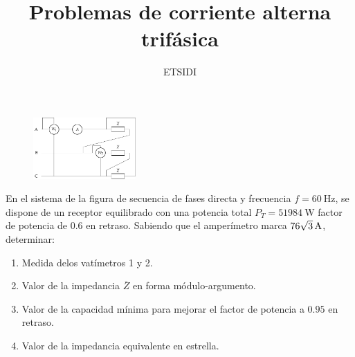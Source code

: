 \documentclass[a4paper,11pt]{article}
\title{Problemas de corriente alterna trifásica}
\date{}
\author{ETSIDI}
\begin{document}
\maketitle


\section{} 
\begin{figure}
		\centering
		\includegraphics[width=0.35\textwidth]{figuras/ej1_CAtrif.pdf}
	\end{figure}
En el sistema de la figura de secuencia de fases directa y frecuencia $f=\SI{60}{\hertz}$, se dispone de un receptor equilibrado con una potencia total $P_T=\SI{51984}{\watt}$ factor de potencia de $0.6$ en retraso. Sabiendo que el amperímetro marca $\SI[parse-numbers=false]{76\sqrt{3}}{\ampere}$, determinar:
\begin{enumerate}
    \item Medida delos vatímetros 1 y 2.
    \item Valor de la impedancia $\overline{Z}$ en forma módulo-argumento.
    \item Valor de la capacidad mínima para mejorar el factor de potencia a $0.95$ en retraso.
    \item Valor de la impedancia equivalente en estrella.
\end{enumerate}

\subsection{}
\end{document}
